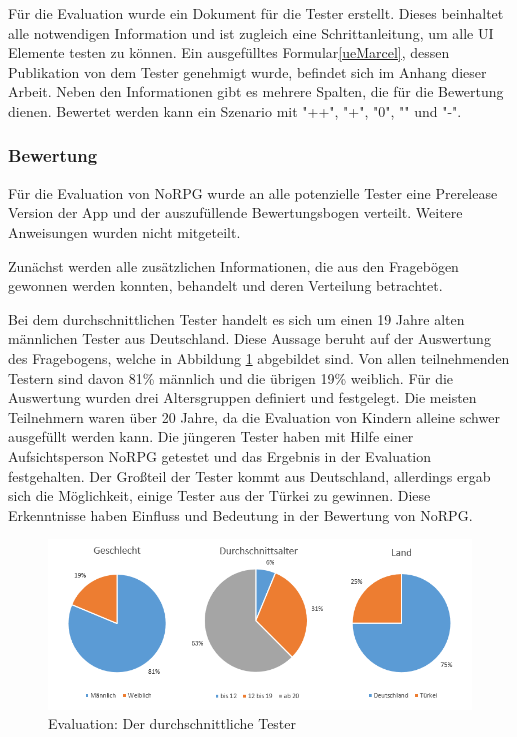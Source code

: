 				Für die Evaluation wurde ein Dokument für die Tester erstellt. Dieses beinhaltet alle notwendigen Information und ist zugleich eine Schrittanleitung, um alle \ac{UI} Elemente testen zu können. Ein ausgefülltes Formular\ref{ueMarcel}, dessen Publikation von dem Tester genehmigt wurde, befindet sich im Anhang dieser Arbeit. Neben den Informationen gibt es mehrere Spalten, die für die Bewertung dienen. Bewertet werden kann ein Szenario mit "++", "+", "0", "\-" und "\--".

			\subsubsection{Bewertung}
				Für die Evaluation von NoRPG wurde an alle potenzielle Tester eine Prerelease Version der App und der auszufüllende Bewertungsbogen verteilt. Weitere Anweisungen wurden nicht mitgeteilt.

				Zunächst werden alle zusätzlichen Informationen, die aus den Fragebögen gewonnen werden konnten, behandelt und deren Verteilung betrachtet.

				Bei dem durchschnittlichen Tester handelt es sich um einen 19 Jahre alten männlichen Tester aus Deutschland. Diese Aussage beruht auf der Auswertung des Fragebogens, welche in Abbildung \ref{auswertungTester} abgebildet sind. Von allen teilnehmenden Testern sind davon 81\% männlich und die übrigen 19\% weiblich. Für die Auswertung wurden drei Altersgruppen definiert und festgelegt. Die meisten Teilnehmern waren über 20 Jahre, da die Evaluation von Kindern alleine schwer ausgefüllt werden kann. Die jüngeren Tester haben mit Hilfe einer Aufsichtsperson NoRPG getestet und das Ergebnis in der Evaluation festgehalten. Der Großteil der Tester kommt aus Deutschland, allerdings ergab sich die Möglichkeit, einige Tester aus der Türkei zu gewinnen. Diese Erkenntnisse haben Einfluss und Bedeutung in der Bewertung von NoRPG.

				\begin{figure}[htbp]
					\centering 
					\label{auswertungTester}
					\includegraphics[width=\textwidth]{pics/TesterAuswertung.png}
					\caption{Evaluation: Der durchschnittliche Tester}
				\end{figure}

